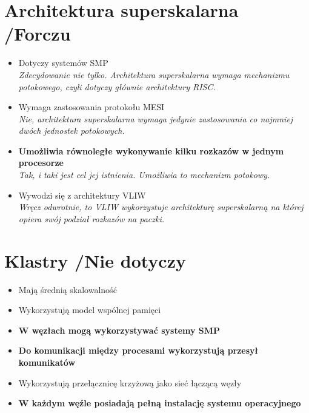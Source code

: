 \documentclass[a4paper,twoside]{article}
\begin{document}
\section{Architektura superskalarna {\small /Forczu}}
	\begin{itemize}
    \item Dotyczy systemów SMP\\
    {\small \emph{Zdecydowanie nie tylko. Architektura superskalarna wymaga mechanizmu potokowego, czyli dotyczy głównie architektury RISC.}}
    \item Wymaga zastosowania protokołu MESI\\
    {\small \emph{Nie, architektura superskalarna wymaga jedynie zastosowania co najmniej dwóch jednostek potokowych.}}
    \item \textbf{Umożliwia równoległe wykonywanie kilku rozkazów w jednym procesorze}\\
    {\small \emph{Tak, i taki jest cel jej istnienia. Umożliwia to mechanizm potokowy.}}
    \item Wywodzi się z architektury VLIW\\
    {\small \emph{Wręcz odwrotnie, to VLIW wykorzystuje architekturę superskalarną na której opiera swój podział rozkazów na paczki.}}
    \end{itemize}

\section{Klastry {\small /Nie dotyczy}}
	\begin{itemize}
    \item Mają średnią skalowalność
    \item Wykorzystują model wspólnej pamięci
    \item \textbf{W węzłach mogą wykorzystywać systemy SMP}
    \item \textbf{Do komunikacji między procesami wykorzystują przesył komunikatów}
    \item Wykorzystują przełącznicę krzyżową jako sieć łączącą węzły
    \item \textbf{W każdym węźle posiadają pełną instalację systemu operacyjnego}
    \end{itemize}
\end{document}
